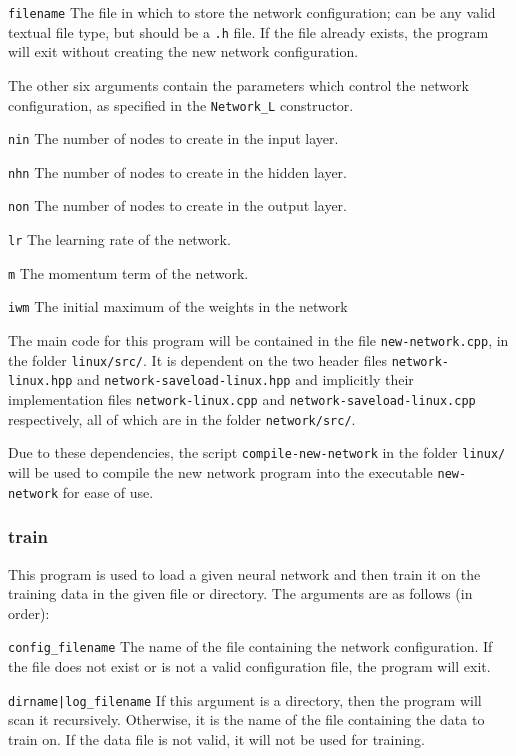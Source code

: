 \documentclass[a4paper]{article}
\begin{document}
\lstinline{filename} The file in which to store the network configuration; can be any valid textual file type, but should be a \lstinline{.h} file. If the file already exists, the program will exit without creating the new network configuration.

The other six arguments contain the parameters which control the network configuration, as specified in the \lstinline{Network_L} constructor.

\lstinline{nin} The number of nodes to create in the input layer.

\lstinline{nhn} The number of nodes to create in the hidden layer.

\lstinline{non} The number of nodes to create in the output layer.

\lstinline{lr} The learning rate of the network.

\lstinline{m} The momentum term of the network.

\lstinline{iwm} The initial maximum of the weights in the network

The main code for this program will be contained in the file \lstinline{new-network.cpp}, in the folder \lstinline{linux/src/}. It is dependent on the two header files \lstinline{network-linux.hpp} and \lstinline{network-saveload-linux.hpp} and implicitly their implementation files \lstinline{network-linux.cpp} and \lstinline{network-saveload-linux.cpp} respectively, all of which are in the folder \lstinline{network/src/}.


Due to these dependencies, the script \lstinline{compile-new-network} in the folder \lstinline{linux/} will be used to compile the new network program into the executable \lstinline{new-network} for ease of use.

\subsubsection{train}
\label{subsubsec:dc_csa_train}

This program is used to load a given neural network and then train it on the training data in the given file or directory. The arguments are as follows (in order):

\lstinline{config_filename} The name of the file containing the network configuration. If the file does not exist or is not a valid configuration file, the program will exit.

\lstinline{dirname|log_filename} If this argument is a directory, then the program will scan it recursively. Otherwise, it is the name of the file containing the data to train on. If the data file is not valid, it will not be used for training.
\end{document}
